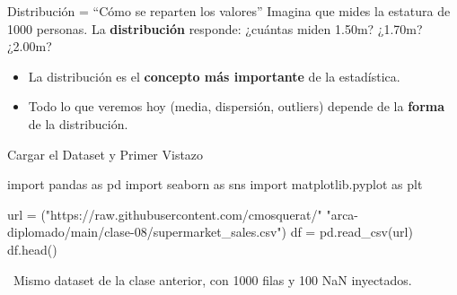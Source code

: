 \documentclass[aspectratio=169, 11pt]{beamer}
\begin{document}
\begin{frame}[shrink=10]{Distribución = ``Cómo se reparten los valores''}
  \vspace{-4pt}
  {\footnotesize
    Imagina que mides la estatura de 1000 personas.
    La \textbf{distribución} responde: ¿cuántas miden 1.50m? ¿1.70m? ¿2.00m?}

  \vspace{6pt}
  \begin{center}
  \end{center}

  \vspace{6pt}
  {\scriptsize\color{textMuted}
  \begin{itemize}\setlength{\itemsep}{3pt}
    \item[{\color{arcaRed}\scriptsize\faArrowRight}]
      La distribución es el \textbf{concepto más importante} de la estadística.
    \item[{\color{arcaRed}\scriptsize\faArrowRight}]
      Todo lo que veremos hoy (media, dispersión, outliers) depende de la \textbf{forma} de la distribución.
  \end{itemize}
  }
\end{frame}

\begin{frame}[fragile,shrink=28]{Cargar el Dataset y Primer Vistazo}
  \vspace{-6pt}
  \begin{pyblock}
import pandas as pd
import seaborn as sns
import matplotlib.pyplot as plt

url = ("https://raw.githubusercontent.com/cmosquerat/"
       "arca-diplomado/main/clase-08/supermarket_sales.csv")
df = pd.read_csv(url)
df.head()
  \end{pyblock}

  \vspace{4pt}
  {\scriptsize\color{textMuted}
    \faLightbulb\ Mismo dataset de la clase anterior, con 1000 filas y 100 NaN inyectados.}
\end{frame}
\end{document}
